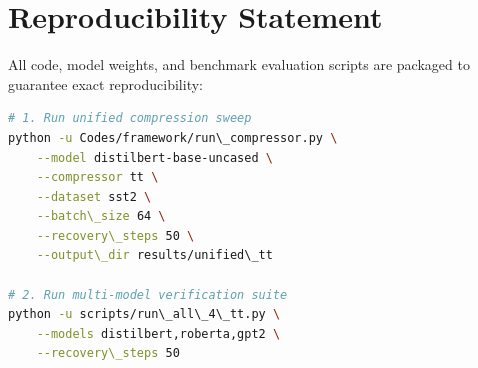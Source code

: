 \section{Reproducibility Statement}
All code, model weights, and benchmark evaluation scripts are packaged to guarantee exact reproducibility:
\begin{lstlisting}[language=bash]
# 1. Run unified compression sweep
python -u Codes/framework/run\_compressor.py \
    --model distilbert-base-uncased \
    --compressor tt \
    --dataset sst2 \
    --batch\_size 64 \
    --recovery\_steps 50 \
    --output\_dir results/unified\_tt

# 2. Run multi-model verification suite
python -u scripts/run\_all\_4\_tt.py \
    --models distilbert,roberta,gpt2 \
    --recovery\_steps 50
\end{lstlisting}
